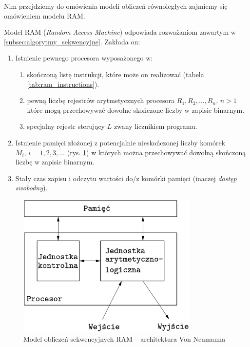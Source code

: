 Nim przejdziemy do omówienia modeli obliczeń równoległych zajmiemy się omówieniem modelu RAM. 


Model RAM (\emph{Random Access Machine}) odpowiada rozważaniom zawartym w \ref{subsec:algorytmy_sekwencyjne}. Zakłada on:
\begin{enumerate}
\item{Istnienie pewnego procesora wyposażonego w:
\begin{enumerate}
\item skończoną listę instrukcji, które może on realizować (tabela \ref{tab:ram_instructions}).
\item pewną liczbę rejestrów arytmetycznych procesora \(R_1, R_2, \dots, R_n\), \(n>1\) które mogą przechowywać dowolne skończone liczby w zapisie binarnym.
\item specjalny rejestr sterujący \(L\) zwany licznikiem programu.
\end{enumerate}}
\item Istnienie pamięci złożonej z potencjalnie nieskończonej liczby komórek \(M_i, \, i=1, 2, 3, \dots\) (rys. \ref{fig:neumann}) w których można przechowywać dowolną skończoną liczbę w zapisie binarnym.
\item Stały czas zapisu i odczytu wartości do/z komórki pamięci (inaczej \emph{dostęp swobodny}).

\end{enumerate}


\begin{figure}[h]
\centering
\includegraphics[width=9cm]{images/Rys_Neumann.eps}

\caption{Model obliczeń sekwencyjnych RAM – architektura Von Neumanna}
\label{fig:neumann}
\end{figure}



